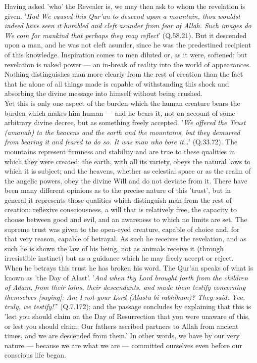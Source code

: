 \documentclass[11pt, b5paper, twoside]{book}
\begin{document}
Having asked 'who' the Revealer is, we may then ask to whom the revelation is given. '\emph{Had We caused this Qur'an to descend upon a mountain, thou wouldst indeed have seen it humbled and cleft asunder from fear of Allah. Such images do We coin for mankind that perhaps they may reflect}' (Q.58.21). But it descended upon a man, and he was not cleft asunder, since he was the predestined recipient of this knowledge. Inspiration comes to men diluted or, as it were, softened; but revelation is naked power --- an in-break of reality into the world of appearances. Nothing distinguishes man more clearly from the rest of creation than the fact that he alone of all things made is capable of withstanding this shock and absorbing the divine message into himself without being crushed. \\

Yet this is only one aspect of the burden which the human creature bears the burden which makes him 
human --- and he bears it, not on account of some arbitrary divine decree, but as something freely 
accepted. '\emph{We offered the Trust (amanah) to the heavens and the earth and the mountains, but they demurred from bearing it and feared to do so. It was man who bore it\ldots{}}' (Q.33.72). The mountains represent firmness and stability and are true to these qualities in which they were created; the 
earth, with all its variety, obeys the natural laws to which it is subject; and the heavens, whether 
as celestial space or as the realm of the angelic powers, obey the divine Will and do not deviate 
from it. There have been many different opinions as to the precise nature of this 'trust', but in 
general it represents those qualities which distinguish man from the rest of creation: reflexive 
consciousness, a will that is relatively free, the capacity to choose between good and evil, and an 
awareness to which no limits are set. The supreme trust was given to the open-eyed creature, capable 
of choice and, for that very reason, capable of betrayal. As such he receives the revelation, and as 
such he is shown the law of his being, not as animals receive it (through irresistible instinct) but 
as a guidance which he may freely accept or reject. \\

When he betrays this trust he has broken his word. The Qur'an speaks of what is known as 'the Day of 
Alast'. '\emph{And when thy Lord brought forth from the children of Adam, from their loins, their 
descendants, and made them testify concerning themselves [saying]: Am I not your Lord (Alastu bi 
rabhikum)? They said: Yea, truly, we testify!'}' (Q.7.172); and the passage concludes by explaining that 
this is 'lest you should claim on the Day of Resurrection that you were unaware of this, or lest you 
should claim: Our fathers ascribed partners to Allah from ancient times, and we are descended from 
them.' In other words, we have by our very nature --- because we are what we are --- committed ourselves 
even before our conscious life began. \\
\end{document}

